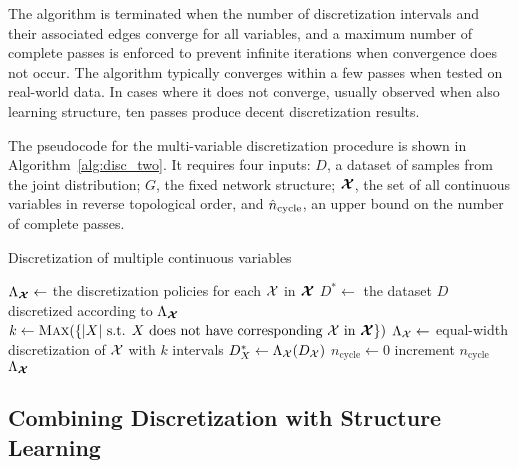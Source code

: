 The algorithm is terminated when the number of discretization intervals and their associated edges converge for all variables, and a maximum number of complete passes is enforced to prevent infinite iterations when convergence does not occur.
The algorithm typically converges within a few passes when tested on real-world data.
In cases where it does not converge, usually observed when also learning structure, ten passes produce decent discretization results.

The pseudocode for the multi-variable discretization procedure is shown in Algorithm~\ref{alg:disc_two}.
It requires four inputs: $D$, a dataset of samples from the joint distribution; $G$, the fixed network structure; $\bm{\mathcal{X}}$, the set of all continuous variables in reverse topological order, and $\hat{n}_\text{cycle}$, an upper bound on the number of complete passes.

\begin{algorithm}
  \caption{Discretization of multiple continuous variables}
  \label{alg:disc_two}
  \begin{algorithmic}[5]
    \State $\Lambda_{\bm{\mathcal{X}}} \leftarrow$ the discretization policies for each $\mathcal{X}$ in $\bm{\mathcal{X}}$
    \State $D^* \leftarrow $ the dataset $D$ discretized according to $\Lambda_{\bm{\mathcal{X}}}$
    \State $k \leftarrow \textsc{Max}\paren{\curly{ |X| \text{ s.t. } X \text{ does not have corresponding } \cX \text{ in } \bm{\cX} }}$
      \State $\Lambda_{\mathcal{X}} \leftarrow$ equal-width discretization of $\mathcal{X}$ with $k$ intervals
      \State $D^*_{X} \leftarrow \Lambda_{\cX} \paren{D_{\cX}}$
    \EndFor
    \State $n_\text{cycle} \leftarrow 0$
      \State increment {$n_\text{cycle}$}
      \EndFor
    \EndWhile
    \State \Return $\Lambda_{\bm{\mathcal{X}}}$
  \EndFunction
  \end{algorithmic}
\end{algorithm}

\subsection{Combining Discretization with Structure Learning}

